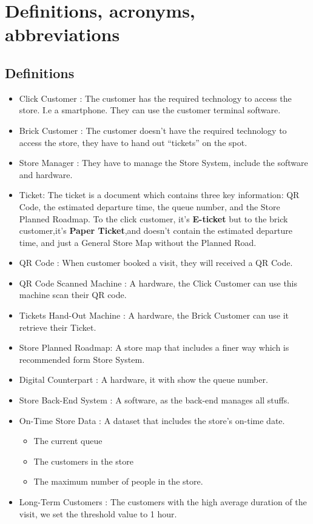 \documentclass[a4paper,12pt]{report}
\begin{document}
\section{Definitions, acronyms, abbreviations}
\subsection{Definitions}\label{Definitions}
\begin{itemize}
	\item Click Customer : The customer has the required technology to access the store. I.e a smartphone. They can use the customer terminal software.
	\item Brick Customer : The customer doesn't have the required technology to access the store, they have to hand out “tickets” on the spot.
	\item Store Manager : They have to manage the Store System, include the software and hardware.
	\item Ticket: The ticket is a document which contains three key information: QR Code, the estimated departure time, the queue number, and the Store Planned Roadmap. To the click customer, it's \textbf{E-ticket} but to the brick customer,it's \textbf{Paper Ticket},and doesn't contain the estimated departure time, and just a General Store Map without the Planned Road.
	\item QR Code : When customer booked a visit, they will received a QR Code.
	\item QR Code Scanned Machine : A hardware, the Click Customer can use this machine scan their QR code.
	\item Tickets Hand-Out Machine : A hardware, the Brick Customer can use it retrieve their Ticket.
	\item Store Planned Roadmap: A store map that includes a finer way which is recommended form Store System.
	\item Digital Counterpart : A hardware, it with show the queue number.
	\item Store Back-End System : A software, as the back-end manages all stuffs.
	\item On-Time Store Data : A dataset that includes the store's on-time date.
	\begin{itemize}
	\item The current queue 
	\item The customers in the store
	\item The maximum number of people in the store.
	\end{itemize}
	\item Long-Term Customers : The customers with the high average duration of the visit, we set the threshold value to 1 hour.
\end{itemize}
\end{document}
